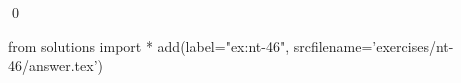 
\begin{ex} 
  \label{ex:nt-46}
  
  \qed
\end{ex} 
\begin{python0}
from solutions import *
add(label="ex:nt-46",
    srcfilename='exercises/nt-46/answer.tex') 
\end{python0}
